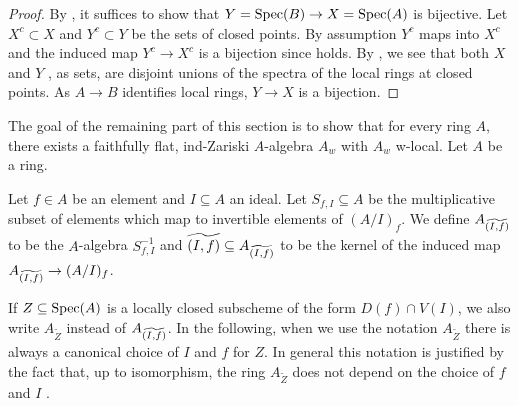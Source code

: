 \begin{proof}
  By , it suffices to show
  that $Y = \operatorname{Spec} (B) \to X = \operatorname{Spec} (A)$ is bijective.
  Let $X^c \subset X$ and $Y^c \subset Y$ be the sets of closed points. By assumption $Y^c$ maps into $X^c$ and the induced map $Y^c \to X^c$ is a bijection since  holds. By , we see that both $X$ and $Y$ , as sets, are disjoint unions of the spectra of the local rings at closed points. As \(A \to B\) identifies local rings, $Y \to X$ is a bijection.
\end{proof}

The goal of the remaining part of this section is to show that for every ring $A$, there exists a faithfully flat, ind-Zariski
$A$-algebra $A_{w}$ with $A_w$ w-local. Let $A$ be a ring.

\begin{definition}
    Let $f \in A$ be an element and $I \subseteq A$ an ideal.
    Let $S_{f, I} \subseteq A$ be the multiplicative subset of elements which map to invertible
    elements of $(A/I)_{f}$.
    We define $A_{\widetilde{(I, f)}}$ to be the $A$-algebra $S_{f, I}^{-1}$
    and $\widetilde{(I, f)} \subseteq A_{\widetilde{(I, f)}}$ to be the kernel of
    the induced map $A_{\widetilde{(I, f)}} \to (A / I)_{f}$.
    \label{def:tilde-locclosed}
\end{definition}

If $Z \subseteq \mathrm{Spec}(A)$ is a locally closed subscheme of the form $D(f) \cap V(I)$, we
also write $A_{\widetilde{Z}}$ instead of $A_{\widetilde{(I, f)}}$.
In the following, when we use the notation $A_{\widetilde{Z}}$ there is always a canonical
choice of $I$ and $f$ for $Z$.
In general this notation is justified by the fact that, up to isomorphism, the ring $A_{\widetilde{Z}}$ does not depend
on the choice of $f$ and $I$ .

